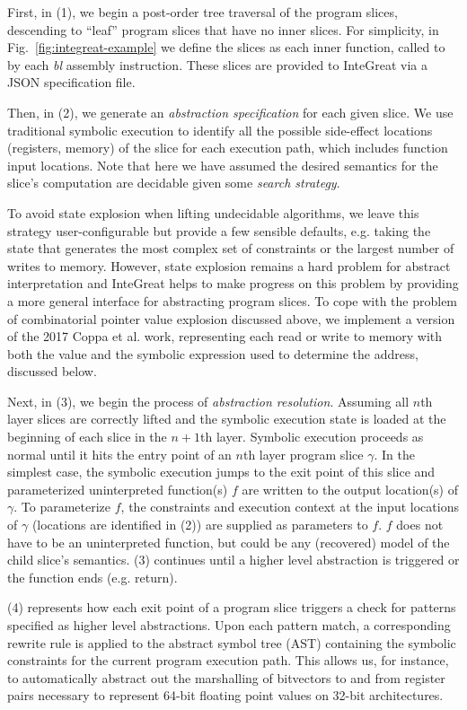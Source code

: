 First, in (1), we begin a post-order tree traversal of the program slices, descending to ``leaf'' program slices that have no inner slices. 
For simplicity, in Fig.~\ref{fig:integreat-example} we define the slices as each inner function, called to by each \emph{bl} assembly instruction.
These slices are provided to InteGreat via a JSON specification file.

Then, in (2), we generate an \emph{abstraction specification} for each given slice.
We use traditional symbolic execution to identify all the possible side-effect locations (registers, memory) of the slice for each execution path, which includes function input locations.
Note that here we have assumed the desired semantics for the slice's computation are decidable given some \emph{search strategy}.

To avoid state explosion when lifting undecidable algorithms, we leave this strategy user-configurable but provide a few sensible defaults, e.g. taking the state that generates the most complex set of constraints or the largest number of writes to memory.
However, state explosion remains a hard problem for abstract interpretation and InteGreat helps to make progress on this problem by providing a more general interface for abstracting program slices.
To cope with the problem of combinatorial pointer value explosion discussed above, we implement a version of the 2017 Coppa et al. work, representing each read or write to memory with both the value and the symbolic expression used to determine the address, discussed below.

Next, in (3), we begin the process of \emph{abstraction resolution}.
Assuming all $n$th layer slices are correctly lifted and the symbolic execution state is loaded at the beginning of each slice in the $n+1$th layer.
Symbolic execution proceeds as normal until it hits the entry point of an $n$th layer program slice $\gamma$.
In the simplest case, the symbolic execution jumps to the exit point of this slice and parameterized uninterpreted function(s) $f$ are written to the output location(s) of $\gamma$.
To parameterize $f$, the constraints and execution context at the input locations of $\gamma$ (locations are identified in (2)) are supplied as parameters to $f$.
$f$ does not have to be an uninterpreted function, but could be any (recovered) model of the child slice's semantics.
(3) continues until a higher level abstraction is triggered or the function ends (e.g. return).

(4) represents how each exit point of a program slice triggers a check for patterns specified as higher level abstractions.
Upon each pattern match, a corresponding rewrite rule is applied to the abstract symbol tree (AST) containing the symbolic constraints for the current program execution path.
This allows us, for instance, to automatically abstract out the marshalling of bitvectors to and from register pairs necessary to represent 64-bit floating point values on 32-bit architectures.

